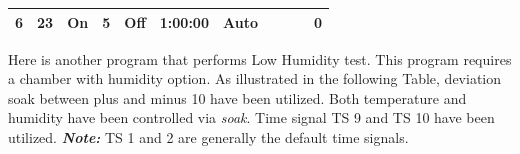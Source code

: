 \begin{longtable}[]{@{}lllllllllll@{}}
\begin{minipage}[t]{0.09\columnwidth}
6\strut
\end{minipage} & \begin{minipage}[t]{0.05\columnwidth}\raggedright
23\strut
\end{minipage} & \begin{minipage}[t]{0.09\columnwidth}\raggedright
On\strut
\end{minipage} & \begin{minipage}[t]{0.06\columnwidth}\raggedright
5\strut
\end{minipage} & \begin{minipage}[t]{0.06\columnwidth}\raggedright
Off\strut
\end{minipage} & \begin{minipage}[t]{0.12\columnwidth}\raggedright
1:00:00\strut
\end{minipage} & \begin{minipage}[t]{0.08\columnwidth}\raggedright
Auto\strut
\end{minipage} & \begin{minipage}[t]{0.04\columnwidth}\raggedright
\strut
\end{minipage} & \begin{minipage}[t]{0.05\columnwidth}\raggedright
\strut
\end{minipage} & \begin{minipage}[t]{0.03\columnwidth}\raggedright
\strut
\end{minipage} & \begin{minipage}[t]{0.03\columnwidth}\raggedright
0\strut
\end{minipage}\tabularnewline
\bottomrule
\end{longtable}

Here is another program that performs Low Humidity test. This program
requires a chamber with humidity option. As illustrated in the following
Table, deviation soak between plus and minus 10 have been utilized. Both
temperature and humidity have been controlled via \emph{soak}. Time
signal TS 9 and TS 10 have been utilized. \textbf{\emph{Note:}} TS 1 and
2 are generally the default time signals.

